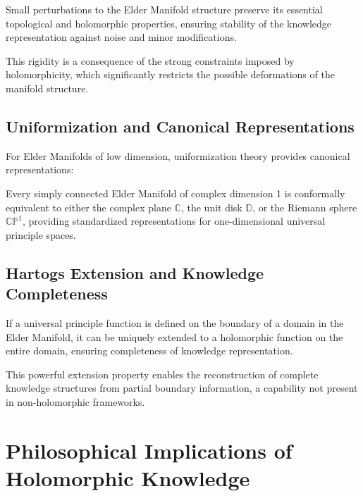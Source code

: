 \begin{theorem}
Small perturbations to the Elder Manifold structure preserve its essential topological and holomorphic properties, ensuring stability of the knowledge representation against noise and minor modifications.
\end{theorem}

This rigidity is a consequence of the strong constraints imposed by holomorphicity, which significantly restricts the possible deformations of the manifold structure.

\subsection{Uniformization and Canonical Representations}

For Elder Manifolds of low dimension, uniformization theory provides canonical representations:

\begin{theorem}
Every simply connected Elder Manifold of complex dimension 1 is conformally equivalent to either the complex plane $\mathbb{C}$, the unit disk $\mathbb{D}$, or the Riemann sphere $\mathbb{CP}^1$, providing standardized representations for one-dimensional universal principle spaces.
\end{theorem}

\subsection{Hartogs Extension and Knowledge Completeness}

\begin{theorem}
If a universal principle function is defined on the boundary of a domain in the Elder Manifold, it can be uniquely extended to a holomorphic function on the entire domain, ensuring completeness of knowledge representation.
\end{theorem}

This powerful extension property enables the reconstruction of complete knowledge structures from partial boundary information, a capability not present in non-holomorphic frameworks.

\section{Philosophical Implications of Holomorphic Knowledge}

